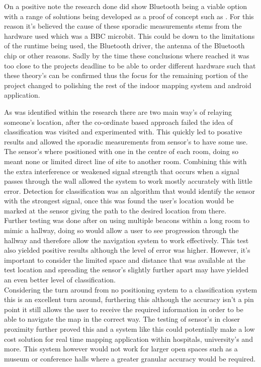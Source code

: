 On a positive note the research done did show Bluetooth being a viable option with a range of solutions being developed as a proof of concept such as \citetemp. For this reason it's believed the cause of these sporadic measurements stems from the hardware used which was a BBC microbit. This could be down to the limitations of the runtime being used, the Bluetooth driver, the antenna of the Bluetooth chip or other reasons. Sadly by the time these conclusions where reached it was too close to the projects deadline to be able to order different hardware such that these theory's can be confirmed thus the focus for the remaining portion of the project changed to polishing the rest of the indoor mapping system and android application.

As was identified within the research there are two main way's of relaying someone's location, after the co-ordinate based approach failed the idea of classification was visited and experimented with. This quickly led to posative results and allowed the sporadic measurements from sensor's to have some use. The sensor's where positioned with one in the centre of each room, doing so meant none or limited direct line of site to another room. Combining this with the extra interference or weakened signal strength that occurs when a signal passes through the wall allowed the system to work mostly accurately with little error. Detection for classification was an algorithm that would identify the sensor with the strongest signal, once this was found the user's location would be marked at the sensor giving the path to the desired location from there.\\

Further testing was done after on using multiple beacons within a long room to mimic a hallway, doing so would allow a user to see progression through the hallway and therefore allow the navigation system to work effectively. This test also yielded positive results although the level of error was higher. However, it's important to consider the limited space and distance that was available at the test location and spreading the sensor's slightly further apart may have yielded an even better level of classification.\\

Considering the turn around from no positioning system to a classification system this is an excellent turn around, furthering this although the accuracy isn't a pin point it still allows the user to receive the required information in order to be able to navigate the map in the correct way. The testing of sensor's in closer proximity further proved this and a system like this could potentially make a low cost solution for real time mapping application within hospitals, university's and more. This system however would not work for larger open spaces such as a museum or conference halls where a greater granular accuracy would be required.

